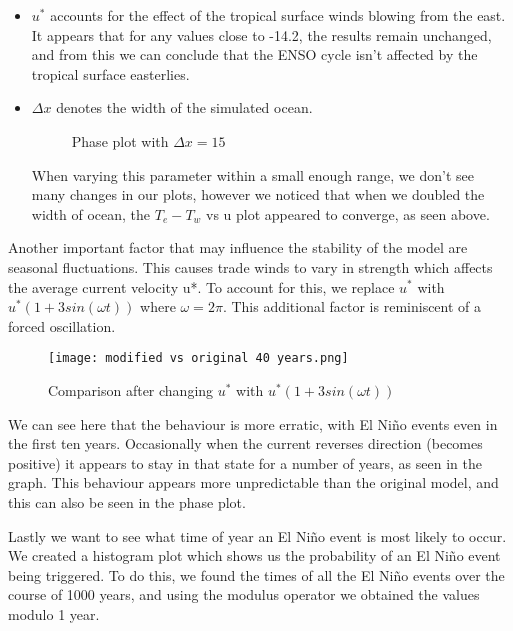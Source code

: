 \documentclass{article}
\begin{document}
\begin{itemize}
\item $u^*$ accounts for the effect of the tropical surface winds blowing from the east. It appears that for any values close to -14.2, the results remain unchanged, and from this we can conclude that the ENSO cycle isn’t affected by the tropical surface easterlies. 

\item $\Delta x$ denotes the width of the simulated ocean.

\begin{figure}[h]
    \centering
    \qquad
    \caption{Phase plot with $\Delta x = 15$}%
    \label{fig:example}%
\end{figure}

When varying this parameter within a small enough range, we don’t see many changes in our plots, however we noticed that when we doubled the width of ocean, the $T_e - T_w$ vs u plot appeared to converge, as seen above.

\end{itemize}


Another important factor that may influence the stability of the model are seasonal fluctuations. This causes trade winds to vary in strength which affects the average current velocity u*. To account for this, we replace $u^*$ with $u^* (1 + 3sin(\omega t))$ where $\omega = 2\pi$. This additional factor is reminiscent of a forced oscillation.

\begin{figure}[h]
\centering
\texttt{[image: modified vs original 40 years.png]}
\caption{\label{fig:Diagram}Comparison after changing $u^*$ with $u^* (1 + 3sin(\omega t))$}
\end{figure}

We can see here that the behaviour is more erratic, with El Niño events even in the first ten years. Occasionally when the current reverses direction (becomes positive) it appears to stay in that state for a number of years, as seen in the graph. This behaviour appears more unpredictable than the original model, and this can also be seen in the phase plot.

\newpage

Lastly we want to see what time of year an El Niño event is most likely to occur. We created a histogram plot which shows us the probability of an El Niño event being triggered. To do this, we found the times of all the El Niño events over the course of 1000 years, and using the modulus operator we obtained the values modulo 1 year. 
\end{document}
